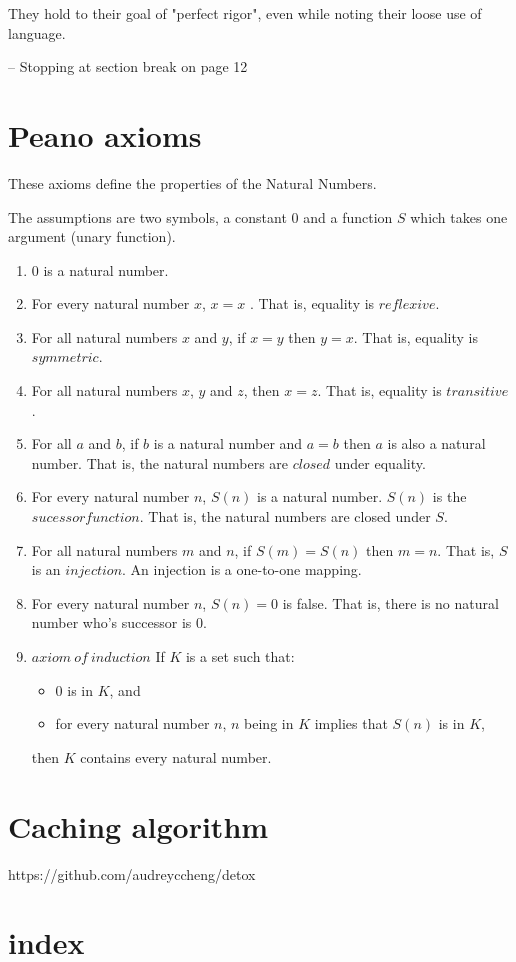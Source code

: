 \documentclass[]{scrartcl}
\begin{document}
They hold to their goal of "perfect rigor", even while noting their loose use of language.

-- Stopping at section break on page 12


\section{Peano axioms}

These axioms define the properties of the Natural Numbers.

The assumptions are two symbols, a constant $0$ and a function $S$ which takes one argument (unary function).

\begin{enumerate}
	\item 0 is a natural number.
	
	\item For every natural number $x$, $x=x$ . That is, equality is $reflexive$.
	
	\item For all natural numbers $x$ and $y$, if $x=y$ then $y=x$. That is, equality is $symmetric$.
	
	\item For all natural numbers $x$, $y$ and $z$, then $x=z$. That is, equality is $transitive$.
	
	\item For all $a$ and $b$, if $b$ is a natural number and $a=b$ then $a$ is also a natural number. That is, the natural numbers are $closed$ under equality.
	
	\item For every natural number $n$, $S(n)$ is a natural number.
	$S(n)$ is the $sucessor function$. 
	That is, the natural numbers are closed under $S$.
	
	\item For all natural numbers $m$ and $n$, if $S(m) = S(n)$ then $m=n$. That is, $S$ is an $injection$. An injection is a one-to-one mapping.
	
	\item For every natural number $n$, $S(n)=0$ is false. That is, there is no natural number who's successor is 0.
	
	\item $axiom\ of\ induction$ If $K$ is a set such that:
	\begin{itemize}
		\item $0$ is in $K$, and
		
		\item for every natural number $n$, $n$ being in $K$ implies that $S(n)$ is in $K$,
	\end{itemize}
	then $K$ contains every natural number.
	
\end{enumerate}



\section{Caching algorithm}

https://github.com/audreyccheng/detox

\section{index}


\end{document}
